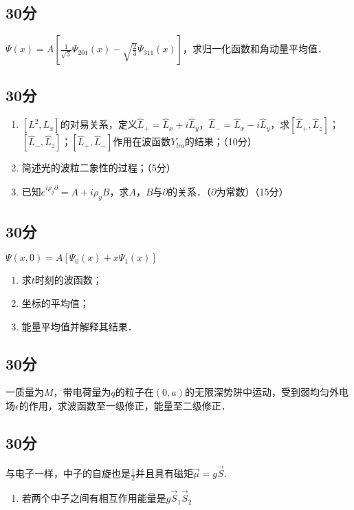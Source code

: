 
\subsection{30分}
$\varPsi (x)=A[\frac{1}{\sqrt{3}}\varPsi_{201}(x)-\sqrt{\frac{2}{3}}\varPsi_{311}(x)]$，求归一化函数和角动量平均值．
\subsection{30分}
\begin{enumerate}
\item $[L^{2},L_{x}]$的对易关系，定义$\hat{L}_{+}=\hat{L}_{x}+i\hat{L}_{y}$，$\hat{L}_{-}=\hat{L}_{x}-i\hat{L}_{y}$，求$[\hat{L}_{+},\hat{L}_{z}]$；$[\hat{L}_{-},\hat{L}_{z}]$；$[\hat{L}_{+},\hat{L}_{-}]$作用在波函数$Y_{lm}$的结果；（10分）
\item 简述光的波粒二象性的过程；（5分）
\item 已知$e^{i\rho_{y}\partial}=A+i\rho_{y}B$，求$A$，$B$与$\partial$的关系．（$\partial$为常数）（15分）
\end{enumerate}
\subsection{30分}
$\varPsi (x,0)=A[\varPsi_{0}(x)+x\varPsi_{1}(x)]$\\
\begin{enumerate}
\item 求$t$时刻的波函数；
\item 坐标的平均值；
\item 能量平均值并解释其结果．
\end{enumerate}
\subsection{30分}
一质量为$M$，带电荷量为$q$的粒子在$(0,a)$的无限深势阱中运动，受到弱均匀外电场$\epsilon$的作用，求波函数至一级修正，能量至二级修正．
\subsection{30分}
与电子一样，中子的自旋也是$\frac{1}{2}$并且具有磁矩$\vec{\mu}=g\vec{S}$.
\begin{enumerate}
\item 若两个中子之间有相互作用能量是$g\vec{S}_{1}\vec{S}_{2}$
\end{enumerate}